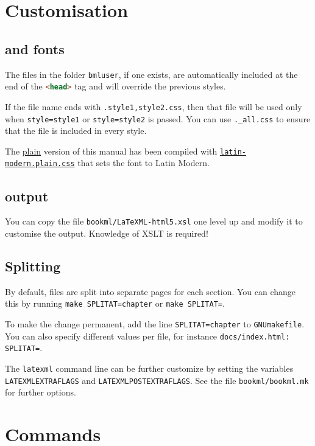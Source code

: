 \documentclass[a4paper,british]{article}
\def\htmlinline{\lstinline[language=html]}
\begin{document}
\section{Customisation}

\subsection{\CSS{} and fonts}
The \CSS{} files in the folder \lstinline|bmluser|, if one exists, are automatically included at the end of the \htmlinline|<head>| tag and will override the previous styles.

If the file name ends with \lstinline|.style1,style2.css|, then that file will be used only when \lstinline|style=style1| or \lstinline|style=style2| is passed. You can use \lstinline|._all.css| to ensure that the file is included in every style.

The \href{https://vlmantova.github.io/bookml/index.plain.html}{plain} version of this manual has been compiled with \href{https://vlmantova.github.io/bookml/bmluser/latin-modern.plain.css}{\texttt{latin-modern.plain.css}} that sets the font to Latin Modern.

\subsection{\HTML{} output}

You can copy the file \texttt{bookml/LaTeXML-html5.xsl} one level up and modify it to customise the \HTML{} output. Knowledge of XSLT is required!

\subsection{Splitting}

By default, files are split into separate pages for each section. You can change this by running \lstinline|make SPLITAT=chapter| or \lstinline|make SPLITAT=|.

To make the change permanent, add the line \lstinline|SPLITAT=chapter| to \texttt{GNUmakefile}. You can also specify different values per file, for instance \lstinline|docs/index.html: SPLITAT=|.

The \lstinline|latexml| command line can be further customize by setting the variables \lstinline|LATEXMLEXTRAFLAGS| and \lstinline|LATEXMLPOSTEXTRAFLAGS|. See the file \texttt{bookml/bookml.mk} for further options.

\section{Commands}
\end{document}
